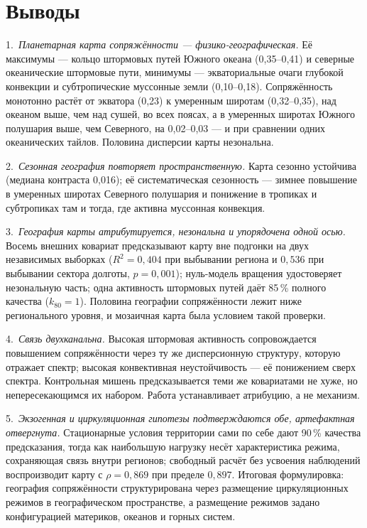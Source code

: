 \documentclass[11pt,a4paper]{article}
\begin{document}
\section{Выводы}
\label{sec:conclusion}

1.~\emph{Планетарная карта сопряжённости --- физико-географическая.} Её максимумы --- кольцо штормовых путей Южного океана (0,35--0,41) и северные океанические штормовые пути, минимумы --- экваториальные очаги глубокой конвекции и субтропические муссонные земли (0,10--0,18). Сопряжённость монотонно растёт от экватора (0,23) к умеренным широтам (0,32--0,35), над океаном выше, чем над сушей, во всех поясах, а в умеренных широтах Южного полушария выше, чем Северного, на 0,02--0,03 --- и при сравнении одних океанических тайлов. Половина дисперсии карты незональна.

2.~\emph{Сезонная география повторяет пространственную.} Карта сезонно устойчива (медиана контраста 0,016); её систематическая сезонность --- зимнее повышение в умеренных широтах Северного полушария и понижение в тропиках и субтропиках там и тогда, где активна муссонная конвекция.

3.~\emph{География карты атрибутируется, незональна и упорядочена одной осью.} Восемь внешних ковариат предсказывают карту вне подгонки на двух независимых выборках ($R^2=0{,}404$ при выбывании региона и $0{,}536$ при выбывании сектора долготы, $p=0{,}001$); нуль-модель вращения удостоверяет незональную часть; одна активность штормовых путей даёт 85\,\% полного качества ($k_{80}=1$). Половина географии сопряжённости лежит ниже регионального уровня, и мозаичная карта была условием такой проверки.

4.~\emph{Связь двухканальна.} Высокая штормовая активность сопровождается повышением сопряжённости через ту же дисперсионную структуру, которую отражает спектр; высокая конвективная неустойчивость --- её понижением сверх спектра. Контрольная мишень предсказывается теми же ковариатами не хуже, но непересекающимся их набором. Работа устанавливает атрибуцию, а не механизм.

5.~\emph{Экзогенная и циркуляционная гипотезы подтверждаются обе, артефактная отвергнута.} Стационарные условия территории сами по себе дают 90\,\% качества предсказания, тогда как наибольшую нагрузку несёт характеристика режима, сохраняющая связь внутри регионов; свободный расчёт без усвоения наблюдений воспроизводит карту с $\rho=0{,}869$ при пределе $0{,}897$. Итоговая формулировка: география сопряжённости структурирована через размещение циркуляционных режимов в географическом пространстве, а размещение режимов задано конфигурацией материков, океанов и горных систем.
\end{document}
